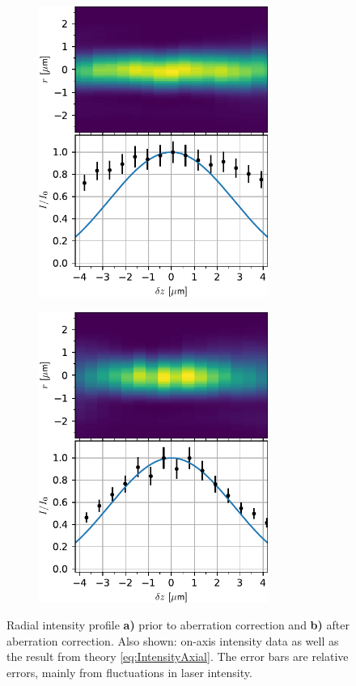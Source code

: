 \begin{figure}[t]
\centering
	\begin{subfigure}{.49\textwidth}
	    \flushleft
		\includegraphics[height=9.5cm]{figures/AxialImageTweezerScanUncorrected.pdf}
		\caption{}
		\label{fig:AxialUncorrected}
	\end{subfigure}
	\begin{subfigure}{.49\textwidth}
		\flushright
		\includegraphics[height=9.5cm]{figures/AxialImageTweezerScan.pdf}
		\caption{}
		\label{fig:AxialZernike}
	\end{subfigure}
	\caption{Radial intensity profile \textsf{\textbf{a)}} prior to aberration correction and \textsf{\textbf{b)}} after aberration correction.
	Also shown: on-axis intensity data as well as the result from theory \cref{eq:IntensityAxial}.
	The error bars are relative errors, mainly from fluctuations in laser intensity.}
	\label{fig:AxialScans}
\end{figure}

